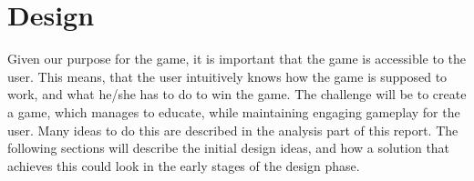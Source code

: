 \chapter{Design}
\label{cha:design}

Given our purpose for the game, it is important that the game is accessible to the user.
This means, that the user intuitively knows how the game is supposed to work, and what he/she has to do to win the game.
The challenge will be to create a game, which manages to educate, while maintaining engaging gameplay for the user.
Many ideas to do this are described in the analysis part of this report.
The following sections will describe the initial design ideas, and how a solution that achieves this could look in the early stages of the design phase.





